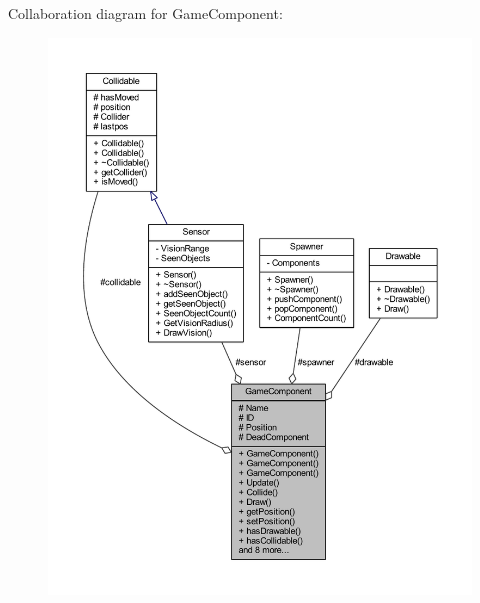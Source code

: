 Collaboration diagram for Game\-Component\-:\nopagebreak
\begin{figure}[H]
\begin{center}
\leavevmode
\includegraphics[width=350pt]{class_game_component__coll__graph}
\end{center}
\end{figure}
